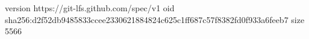 version https://git-lfs.github.com/spec/v1
oid sha256:d2f52db9485833ccee2330621884824c625c1ff687c57f8382fd0f933a6feeb7
size 5566
